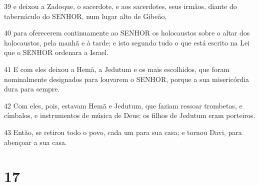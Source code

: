 \par 39 e deixou a Zadoque, o sacerdote, e aos sacerdotes, seus irmãos, diante do tabernáculo do SENHOR, num lugar alto de Gibeão,
\par 40 para oferecerem continuamente ao SENHOR os holocaustos sobre o altar dos holocaustos, pela manhã e à tarde; e isto segundo tudo o que está escrito na Lei que o SENHOR ordenara a Israel.
\par 41 E com eles deixou a Hemã, a Jedutum e os mais escolhidos, que foram nominalmente designados para louvarem o SENHOR, porque a sua misericórdia dura para sempre.
\par 42 Com eles, pois, estavam Hemã e Jedutum, que faziam ressoar trombetas, e címbalos, e instrumentos de música de Deus; os filhos de Jedutum eram porteiros.
\par 43 Então, se retirou todo o povo, cada um para sua casa; e tornou Davi, para abençoar a sua casa.

\chapter{17}

